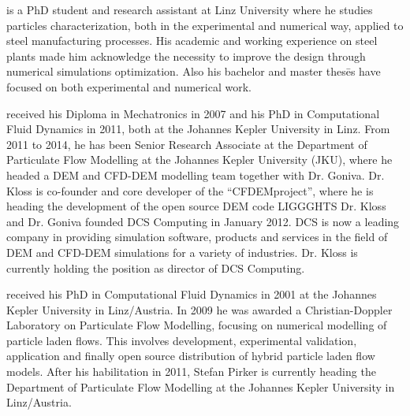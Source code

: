  is a PhD student and research assistant at Linz University where he studies particles characterization, both in the experimental and numerical way, 
applied to steel manufacturing processes. His academic and working experience on steel plants made him acknowledge the necessity to improve the design through numerical simulations 
optimization. Also his bachelor and master thes\={e}s have focused on both experimental and numerical work.

\vspace{2cm}

 received his Diploma in Mechatronics in 2007 and his PhD in Computational Fluid Dynamics in 2011, 
both at the Johannes Kepler University in Linz. From 2011 to 2014, he has been Senior Research Associate at the Department of 
Particulate Flow Modelling at the Johannes Kepler University (JKU), where he headed a DEM and CFD-DEM modelling team together 
with Dr. Goniva. Dr. Kloss is co-founder and core developer of the ``CFDEM\textregistered project'', where he is heading the development of the open source DEM code LIGGGHTS\textregistered
Dr. Kloss and Dr. Goniva founded DCS Computing in January 2012. DCS is now a leading company in providing simulation software, 
products and services in the field of DEM and CFD-DEM simulations for a variety of industries. Dr. Kloss is currently holding the position as director of DCS Computing.

\vspace{2cm}

 received his PhD in Computational Fluid Dynamics in 2001 at the Johannes Kepler University in Linz/Austria. 
In 2009 he was awarded a Christian-Doppler Laboratory on Particulate Flow Modelling, focusing on numerical modelling of particle laden flows. 
This involves development, experimental validation, application and finally open source distribution of hybrid particle laden flow models. 
After his habilitation in 2011, Stefan Pirker is currently heading the Department of Particulate Flow Modelling at the Johannes Kepler University in Linz/Austria.
